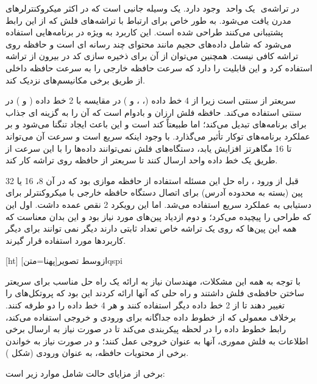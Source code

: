 در تراشه‌ی ‌ یک واحد ‌ وجود دارد.  یک وسیله جانبی است که در اکثر میکروکنترلرهای مدرن یافت می‌شود. به طور خاص برای ارتباط با تراشه‌های فلش که از این رابط پشتیبانی می‌کنند طراحی شده است. این کاربرد به ویژه در برنامه‌هایی استفاده می‌شود که شامل داده‌های حجیم مانند محتوای چند رسانه ای است و حافظه روی تراشه کافی نیست. همچنین می‌توان از آن برای ذخیره سازی کد در بیرون از تراشه استفاده کرد و این قابلیت را دارد که سرعت حافظه خارجی را به سرعت حافظه داخلی از طریق برخی مکانیسم‌های نزدیک کند.

سریعتر از  سنتی است زیرا از 4 خط داده (، ،  و ) در مقایسه با 2 خط داده ( و ) در  سنتی استفاده می‌کند. حافظه فلش ارزان و بادوام است که آن را به گزینه ای جذاب برای برنامه‌های  تبدیل می‌کند؛ اما طبیعتاً کند است و این باعث ایجاد تنگنا می‌شود و بر عملکرد برنامه‌های توکار تأثیر می‌گذارد. با وجود اینکه  سریع است و سرعت آن می‌تواند تا 16 مگاهرتز افزایش یابد، دستگاه‌های فلش نمی‌توانند داده‌ها را با این سرعت از طریق یک خط داده واحد ارسال کنند تا سریعتر از حافظه روی تراشه کار کند.

قبل از ورود ، راه حل این مسئله استفاده از حافظه موازی بود که در آن 8، 16 یا 32 پین (بسته به محدوده آدرس) برای اتصال دستگاه حافظه خارجی با میکروکنترلر برای دستیابی به عملکرد سریع استفاده می‌شد. اما این رویکرد 2 نقص عمده داشت. اول این که طراحی  را پیچیده می‌کرد؛ و دوم ازدیاد پین‌های مورد نیاز بود و این بدان معناست که همه این پین‌ها که روی یک تراشه خاص تعداد ثابتی دارند دیگر نمی توانند برای دیگر کاربردها مورد استفاده قرار گیرند.

[ht]
‌ازوسط
‌تصویر[پهنا=‌متن]{qspi}

با توجه به همه این مشکلات، مهندسان نیاز به ارائه یک راه حل مناسب برای سریعتر ساختن حافظه‌ی فلش داشتند و راه حلی که آنها ارائه کردند این بود که پروتکل‌های  را تغییر دهند تا از 2 خط داده دیگر استفاده کنند و هر 4 خط داده را دو طرفه کنند. برخلاف  معمولی که از خطوط داده جداگانه برای ورودی و خروجی استفاده می‌کند، رابط  خطوط داده را در لحظه پیکربندی می‌کند تا در صورت نیاز به ارسال برخی اطلاعات به فلش مموری، آنها به عنوان خروجی عمل کنند؛ و در صورت نیاز به خواندن برخی از محتویات حافظه، به عنوان ورودی (شکل ).

برخی از مزایای حالت  شامل موارد زیر است:


